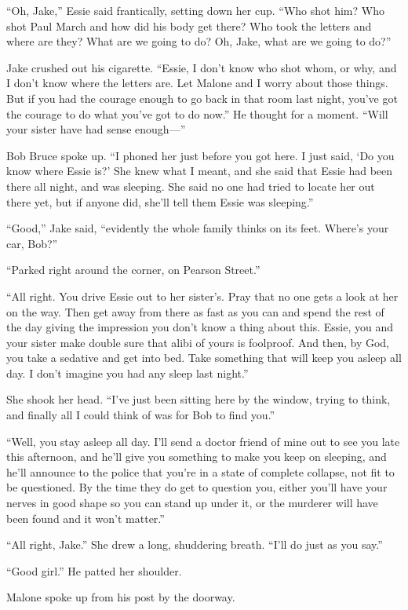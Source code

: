 \documentclass{novel}
\begin{document}
“Oh, Jake,” Essie said frantically, setting down her cup. “Who shot him? Who shot Paul March and how did his body get there? Who took the letters and where are they? What are we going to do? Oh, Jake, what are we going to do?”

Jake crushed out his cigarette. “Essie, I don’t know who shot whom, or why, and I don’t know where the letters are. Let Malone and I worry about those things. But if you had the courage enough to go back in that room last night, you’ve got the courage to do what you’ve got to do now.” He thought for a moment. “Will your sister have had sense enough—”

Bob Bruce spoke up. “I phoned her just before you got here. I just said, ‘Do you know where Essie is?’ She knew what I meant, and she said that Essie had been there all night, and was sleeping. She said no one had tried to locate her out there yet, but if anyone did, she’ll tell them Essie was sleeping.”

“Good,” Jake said, “evidently the whole family thinks on its feet. Where’s your car, Bob?”

“Parked right around the corner, on Pearson Street.”

“All right. You drive Essie out to her sister’s. Pray that no one gets a look at her on the way. Then get away from there as fast as you can and spend the rest of the day giving the impression you don’t know a thing about this. Essie, you and your sister make double sure that alibi of yours is foolproof. And then, by God, you take a sedative and get into bed. Take something that will keep you asleep all day. I don’t imagine you had any sleep last night.”

She shook her head. “I’ve just been sitting here by the window, trying to think, and finally all I could think of was for Bob to find you.”

“Well, you stay asleep all day. I’ll send a doctor friend of mine out to see you late this afternoon, and he’ll give you something to make you keep on sleeping, and he’ll announce to the police that you’re in a state of complete collapse, not fit to be questioned. By the time they do get to question you, either you’ll have your nerves in good shape so you can stand up under it, or the murderer will have been found and it won’t matter.”

“All right, Jake.” She drew a long, shuddering breath. “I’ll do just as you say.”

“Good girl.” He patted her shoulder.

Malone spoke up from his post by the doorway.
\end{document}
